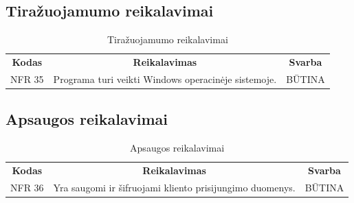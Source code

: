 \documentclass{VUMIFPSkursinis}
\begin{document}
\subsection{Tiražuojamumo reikalavimai}
\begin{center}
	\begin{table}[H]
	\caption{Tiražuojamumo reikalavimai}
	\begin{tabular}{|p{2cm}|p{}|p{}|}
	\hline
	    \rowcolor{lightgray}
		\multicolumn{3}{|c|}{Tiražuojamumo reikalavimai}\\
		
	\hline
		\multicolumn{1}{|c|}{{\bfseries Kodas}}&
		\multicolumn{1}{|c|}{{\bfseries Reikalavimas}}&
		\multicolumn{1}{|c|}{{\bfseries Svarba}}\\
	\hline 	
		\multicolumn{1}{|c|}{NFR 35}&
		{Programa turi veikti Windows operacinėje sistemoje.}&
		\multicolumn{1}{|c|}{BŪTINA}\\	
	
	\hline 	
	\end{tabular}
	
	\label{table:Tiražuojamumoreikalavimai}
	\end{table}

\end{center}

\subsection{Apsaugos reikalavimai}
\begin{center}
	\begin{table}[H]
	\caption{Apsaugos reikalavimai}
	\begin{tabular}{|p{2cm}|p{}|p{}|}
	\hline
	    \rowcolor{lightgray}
		\multicolumn{3}{|c|}{Apsaugos reikalavimai}\\
		
	\hline
		\multicolumn{1}{|c|}{{\bfseries Kodas}}&
		\multicolumn{1}{|c|}{{\bfseries Reikalavimas}}&
		\multicolumn{1}{|c|}{{\bfseries Svarba}}\\
	\hline 	
		\multicolumn{1}{|c|}{NFR 36}&
		{Yra saugomi ir šifruojami kliento prisijungimo duomenys.}&
		\multicolumn{1}{|c|}{BŪTINA}\\	
	
	\hline 	
	\end{tabular}
	
	\label{table:Apsaugosreikalavimai}
	\end{table}

\end{center}
\end{document}
